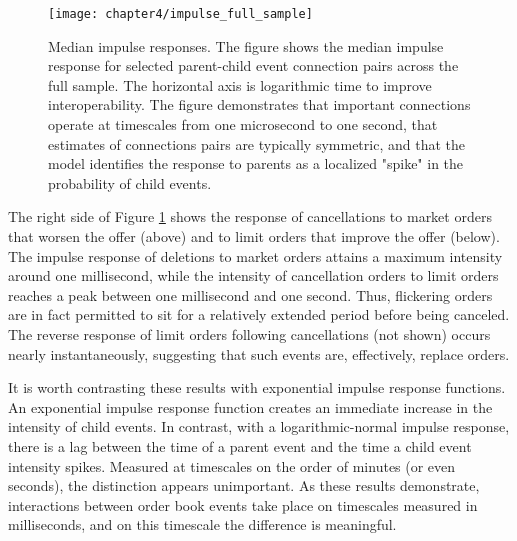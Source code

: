 		\begin{figure}[p]
			\small
			\linespread{1}
			\centering
			\texttt{[image: chapter4/impulse\_full\_sample]}
			\captionsetup{skip=-20pt, position=below, font=footnotesize, justification=justified, width=\linewidth}
			\caption[Median impulse responses]{Median impulse responses. The figure shows the median impulse response for selected parent-child event connection pairs across the full sample. The horizontal axis is logarithmic time to improve interoperability. The figure demonstrates that important connections operate at timescales from one microsecond to one second, that estimates of connections pairs are typically symmetric, and that the model identifies the response to parents as a localized "spike" in the probability of child events.}
			\label{fig:impulse_full_sample}
		\end{figure}

		The right side of Figure \ref{fig:impulse_full_sample} shows the response of cancellations to market orders that worsen the offer (above) and to limit orders that improve the offer (below). The impulse response of deletions to market orders attains a maximum intensity around one millisecond, while the intensity of cancellation orders to limit orders reaches a peak between one millisecond and one second. Thus, flickering orders are in fact permitted to sit for a relatively extended period before being canceled. The reverse response of limit orders following cancellations (not shown) occurs nearly instantaneously, suggesting that such events are, effectively, replace orders.

		It is worth contrasting these results with exponential impulse response functions. An exponential impulse response function creates an immediate increase in the intensity of child events. In contrast, with a logarithmic-normal impulse response, there is a lag between the time of a parent event and the time a child event intensity spikes. Measured at timescales on the order of minutes (or even seconds), the distinction appears unimportant. As these results demonstrate, interactions between order book events take place on timescales measured in milliseconds, and on this timescale the difference is meaningful.

